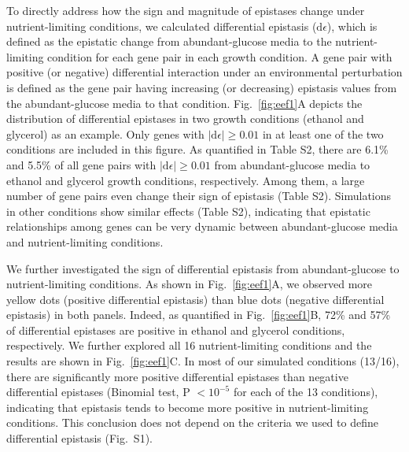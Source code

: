 \documentclass[10pt]{article}
\newcommand\D{\mathrm{d}}
\newcommand{\Fig}{Fig.}
\begin{document}
To directly address how the sign and magnitude of epistases change
under nutrient-limiting conditions, we calculated differential
epistasis ($\D\epsilon$), which is defined as the epistatic change from
abundant-glucose media to the nutrient-limiting condition for each
gene pair in each growth condition. A gene pair with positive (or
negative) differential interaction under an environmental perturbation
is defined as the gene pair having increasing (or decreasing)
epistasis values from the abundant-glucose media to that
condition. \Fig~\ref{fig:eef1}A depicts the
distribution of differential
epistases in two growth conditions (ethanol and glycerol) as an
example. Only genes with $\left|\D\epsilon\right| \geq 0.01$ in at least
one of the two conditions are included in this figure. As quantified
in Table S2, there are 6.1\% and 5.5\% of all gene pairs with
$\left|\D\epsilon\right| \geq 0.01$ from abundant-glucose media to ethanol
and glycerol growth conditions, respectively. Among them, a large
number of gene pairs even change their sign of epistasis (Table
S2). Simulations in other conditions show similar effects (Table S2),
indicating that epistatic relationships among genes can be very
dynamic between abundant-glucose media and nutrient-limiting
conditions.



We further investigated the sign of differential epistasis from
abundant-glucose to nutrient-limiting conditions. As shown in \Fig~\ref{fig:eef1}A, 
we observed more yellow dots (positive differential epistasis)
than blue dots (negative differential epistasis) in both
panels. Indeed, as quantified in \Fig~\ref{fig:eef1}B, 72\% and 57\% of
differential epistases are positive in ethanol and glycerol
conditions, respectively. We further explored all 16 nutrient-limiting
conditions and the results are shown in \Fig~\ref{fig:eef1}C. In most of our
simulated conditions (13/16), there are significantly more positive
differential epistases than negative differential epistases (Binomial
test, P $< 10^{-5}$ for each of the 13 conditions), indicating that
epistasis tends to become more positive in nutrient-limiting
conditions. This conclusion does not depend on the criteria we used to
define differential epistasis (\Fig~S1).
\end{document}
